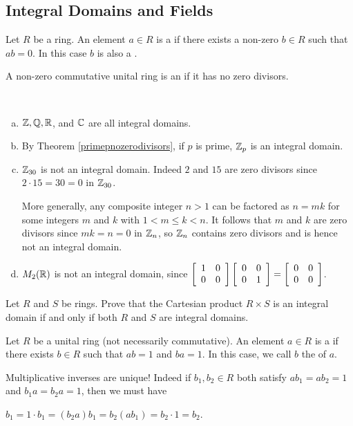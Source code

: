 \documentclass[11pt,fleqn,dvipsnames,usenames]{article}
\newcommand{\p}{\noindent}
\begin{document}
\subsection{Integral Domains and Fields}
%
\begin{definition}
Let $R$ be a ring.  An element $a\in R$ is a  if there exists a non-zero $b\in R$ such that $ab = 0$.  In this case $b$ is also a .
\end{definition}
%
\begin{definition}
A non-zero commutative unital ring is an  if it has no zero divisors.
\end{definition}
%
\begin{examples}~
\begin{enumerate}[(a)]
\item $\Z, \RATIONAL, \REAL$, and $\COMPLEX$ are all integral domains.
\item By Theorem \ref{primepnozerodivisors}, if $p$ is prime, $\Z_p$ is an integral domain.
\item $\Z_{30}$ is not an integral domain.  Indeed $2$ and $15$ are zero divisors since $2\cdot 15 = 30 = 0$ in $\Z_{30}$.
\vsmsp

\p More generally, any composite integer $n>1$ can be factored as $n = mk$ for some integers $m$ and $k$ with $1 < m\leq k < n$.  It follows that $m$ and $k$ are zero divisors since $mk = n = 0$ in $\ZN$, so $\ZN$ contains zero divisors and is hence not an integral domain.
\item $M_{2}(\REAL)$ is not an integral domain, since $\MATRIX{rr}{1 & 0\\0 & 0}\MATRIX{rr}{0 & 0\\0 & 1} = \MATRIX{rr}{0 & 0\\0 & 0}$.
\end{enumerate}
\end{examples}
%
\begin{exercise}
Let $R$ and $S$ be rings.  Prove that the Cartesian product $R\times S$ is an integral domain if and only if both $R$ and $S$ are integral domains.
\end{exercise}
%
\begin{definition}
Let $R$ be a unital ring (not necessarily commutative).  An element $a\in R$ is a  if there exists $b\in R$ such that $ab = 1$ and $ba = 1$.  In this case, we call $b$ the  of $a$.
\end{definition}
%
\begin{remark}
Multiplicative inverses are unique!  Indeed if $b_{1},b_{2}\in R$ both satisfy $ab_{1} = ab_{2} = 1$ and $b_{1}a = b_{2}a = 1$, then we must have
\begin{center}
$b_1 = 1\cdot b_1 = (b_2a)b_1 = b_2(ab_1) = b_2\cdot 1 = b_2$.
\end{center}
\end{remark}
\end{document}
